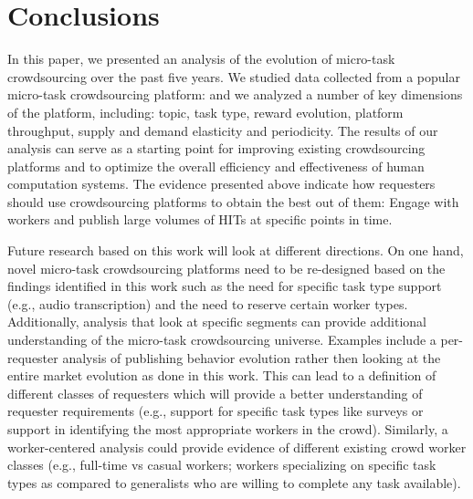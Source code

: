 \section{Conclusions}\label{sec:conc}

In this paper, we presented an analysis of the evolution of micro-task crowdsourcing over the past five years.
We studied data collected from a popular micro-task crowdsourcing platform: \amt{}
and we analyzed a number of key dimensions of the platform, including: topic, task type,  reward evolution, platform throughput, supply and demand elasticity and periodicity. The results of our analysis can serve as a starting point for improving existing crowdsourcing platforms and to optimize the overall efficiency and effectiveness of human computation systems. The evidence presented above  indicate how requesters should use crowdsourcing platforms to obtain the best out of them: Engage with workers and publish large volumes of HITs at specific points in time. 


Future research based on this work will look at different directions. On one hand, novel micro-task crowdsourcing platforms need to be re-designed based on the findings identified in this work such as the need for specific task type support (e.g., audio transcription) and the need to reserve certain worker types.
% 
Additionally, analysis that look at specific segments can provide additional understanding of the micro-task crowdsourcing universe. Examples include a per-requester analysis of publishing behavior evolution rather then looking at the entire market evolution as done in this work. This can lead to a definition of different classes of requesters which will provide a better understanding of requester requirements (e.g., support for specific task types like surveys or support in identifying the most appropriate workers in the crowd). Similarly, a worker-centered analysis could provide evidence of different existing crowd worker classes (e.g., full-time vs casual workers; workers specializing on specific task types as compared to generalists  who are willing to complete any task available).